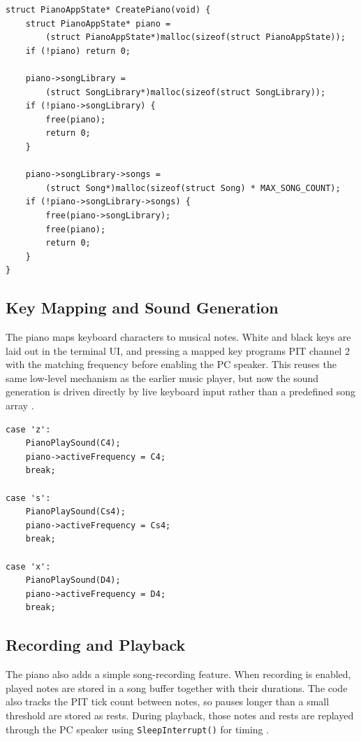 \begin{listing}[H]
\begin{verbatim}
struct PianoAppState* CreatePiano(void) {
    struct PianoAppState* piano =
        (struct PianoAppState*)malloc(sizeof(struct PianoAppState));
    if (!piano) return 0;

    piano->songLibrary =
        (struct SongLibrary*)malloc(sizeof(struct SongLibrary));
    if (!piano->songLibrary) {
        free(piano);
        return 0;
    }

    piano->songLibrary->songs =
        (struct Song*)malloc(sizeof(struct Song) * MAX_SONG_COUNT);
    if (!piano->songLibrary->songs) {
        free(piano->songLibrary);
        free(piano);
        return 0;
    }
}
\end{verbatim}
\caption{The piano allocates persistent application state and storage for recorded songs.}
\end{listing}

\subsection{Key Mapping and Sound Generation}
The piano maps keyboard characters to musical notes. White and black keys are laid out in the terminal UI, and pressing a mapped key programs PIT channel 2 with the matching frequency before enabling the PC speaker. This reuses the same low-level mechanism as the earlier music player, but now the sound generation is driven directly by live keyboard input rather than a predefined song array \cite{osdevPcSpeaker,osdevPit}.

\begin{listing}[H]
\begin{verbatim}
case 'z':
    PianoPlaySound(C4);
    piano->activeFrequency = C4;
    break;

case 's':
    PianoPlaySound(Cs4);
    piano->activeFrequency = Cs4;
    break;

case 'x':
    PianoPlaySound(D4);
    piano->activeFrequency = D4;
    break;
\end{verbatim}
\caption{Keyboard input is translated into note frequencies for live piano playback.}
\end{listing}

\subsection{Recording and Playback}
The piano also adds a simple song-recording feature. When recording is enabled, played notes are stored in a song buffer together with their durations. The code also tracks the PIT tick count between notes, so pauses longer than a small threshold are stored as rests. During playback, those notes and rests are replayed through the PC speaker using \texttt{SleepInterrupt()} for timing \cite{osdevPit,osdevPcSpeaker}.

